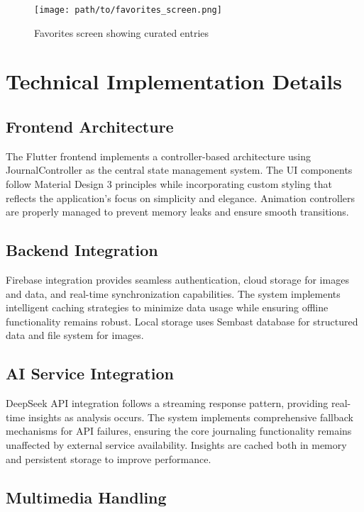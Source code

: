 \begin{figure}[H]
\centering
\texttt{[image: path/to/favorites\_screen.png]}
\caption{Favorites screen showing curated entries}
\label{fig:favorites-screen}
\end{figure}

\section{Technical Implementation Details}

\subsection{Frontend Architecture}

The Flutter frontend implements a controller-based architecture using JournalController as the central state management system. The UI components follow Material Design 3 principles while incorporating custom styling that reflects the application's focus on simplicity and elegance. Animation controllers are properly managed to prevent memory leaks and ensure smooth transitions.

\subsection{Backend Integration}

Firebase integration provides seamless authentication, cloud storage for images and data, and real-time synchronization capabilities. The system implements intelligent caching strategies to minimize data usage while ensuring offline functionality remains robust. Local storage uses Sembast database for structured data and file system for images.

\subsection{AI Service Integration}

DeepSeek API integration follows a streaming response pattern, providing real-time insights as analysis occurs. The system implements comprehensive fallback mechanisms for API failures, ensuring the core journaling functionality remains unaffected by external service availability. Insights are cached both in memory and persistent storage to improve performance.

\subsection{Multimedia Handling}

